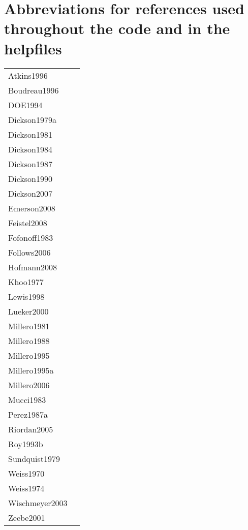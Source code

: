 \documentclass[article,nojss]{jss}
\begin{document}
\section{Abbreviations for references used throughout the code and in the helpfiles}
\begin{tabular}{ll}
Atkins1996       & \cite{Atkins1996} \\
Boudreau1996     & \cite{Boudreau1996}\\
DOE1994          & \cite{DOE1994}\\
Dickson1979a     & \cite{Dickson1979a}\\
Dickson1981      & \cite{Dickson1981}\\
Dickson1984      & \cite{Dickson1984}\\
Dickson1987      & \cite{Dickson1987}\\
Dickson1990      & \cite{Dickson1990}\\
Dickson2007      & \cite{Dickson2007}\\
Emerson2008      & \cite{Emerson2008}\\
Feistel2008      & \cite{Feistel2008}\\
Fofonoff1983     & \cite{Fofonoff1983}\\
Follows2006      & \cite{Follows2006}\\
Hofmann2008      & \cite{Hofmann2008}\\
Khoo1977         & \cite{Khoo1977}\\
Lewis1998        & \cite{Lewis1998}\\
Lueker2000       & \cite{Lueker2000}\\
Millero1981      & \cite{Millero1981}\\
Millero1988      & \cite{Millero1988}\\
Millero1995      & \cite{Millero1995}\\
Millero1995a     & \cite{Millero1995a}\\
Millero2006      & \cite{Millero2006}\\
Mucci1983        & \cite{Mucci1983}\\
Perez1987a       & \cite{Perez1987a}\\
Riordan2005      & \cite{Riordan2005}\\
Roy1993b         & \cite{Roy1993b}\\
Sundquist1979    & \cite{Sundquist1979}\\
Weiss1970        & \cite{Weiss1970}\\
Weiss1974        & \cite{Weiss1974}\\
Wischmeyer2003   & \cite{Wischmeyer2003}\\
Zeebe2001        & \cite{Zeebe2001}\\
\end{tabular}
\end{document}

